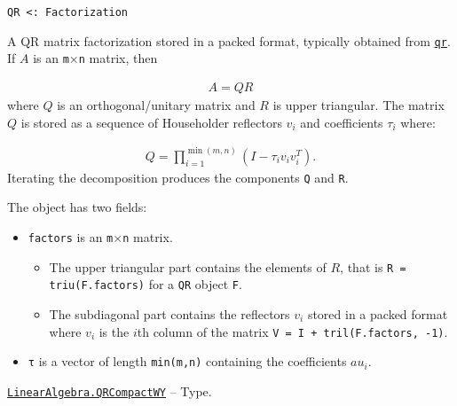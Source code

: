 \begin{adjustwidth}{2em}{0pt}


\begin{verbatim}
QR <: Factorization
\end{verbatim}

A QR matrix factorization stored in a packed format, typically obtained from \hyperlink{4122539696772350360}{\texttt{qr}}. If \(A\) is an \texttt{m}×\texttt{n} matrix, then

\begin{equation*}
\begin{split}A = Q R\end{split}\end{equation*}
where \(Q\) is an orthogonal/unitary matrix and \(R\) is upper triangular. The matrix \(Q\) is stored as a sequence of Householder reflectors \(v_i\) and coefficients \(\tau_i\) where:

\begin{equation*}
\begin{split}Q = \prod_{i=1}^{\min(m,n)} (I - \tau_i v_i v_i^T).\end{split}\end{equation*}
Iterating the decomposition produces the components \texttt{Q} and \texttt{R}.

The object has two fields:

\begin{itemize}
\item \texttt{factors} is an \texttt{m}×\texttt{n} matrix.

\begin{itemize}
\item The upper triangular part contains the elements of \(R\), that is \texttt{R = triu(F.factors)} for a \texttt{QR} object \texttt{F}.


\item The subdiagonal part contains the reflectors \(v_i\) stored in a packed format where \(v_i\) is the \(i\)th column of the matrix \texttt{V = I + tril(F.factors, -1)}.

\end{itemize}

\item \texttt{τ} is a vector  of length \texttt{min(m,n)} containing the coefficients \(au_i\).

\end{itemize}


\end{adjustwidth}
\hypertarget{15814215390089782499}{} 
\hyperlink{15814215390089782499}{\texttt{LinearAlgebra.QRCompactWY}}  -- {Type.}

